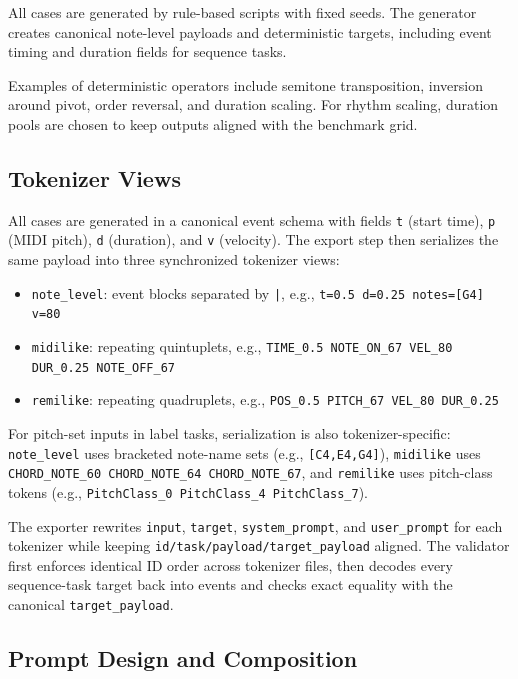 \documentclass{article}
\begin{document}
All cases are generated by rule-based scripts with fixed seeds. The generator creates canonical note-level payloads and deterministic targets, including event timing and duration fields for sequence tasks.

Examples of deterministic operators include semitone transposition, inversion around pivot, order reversal, and duration scaling. For rhythm scaling, duration pools are chosen to keep outputs aligned with the benchmark grid.

\subsection{Tokenizer Views}

All cases are generated in a canonical event schema with fields \texttt{t} (start time), \texttt{p} (MIDI pitch), \texttt{d} (duration), and \texttt{v} (velocity). The export step then serializes the same payload into three synchronized tokenizer views:
\begin{itemize}
    \item \texttt{note\_level}: event blocks separated by \texttt{|}, e.g., \texttt{t=0.5 d=0.25 notes=[G4] v=80}
    \item \texttt{midilike}: repeating quintuplets, e.g., \texttt{TIME\_0.5 NOTE\_ON\_67 VEL\_80 DUR\_0.25 NOTE\_OFF\_67}
    \item \texttt{remilike}: repeating quadruplets, e.g., \texttt{POS\_0.5 PITCH\_67 VEL\_80 DUR\_0.25}
\end{itemize}

For pitch-set inputs in label tasks, serialization is also tokenizer-specific: \texttt{note\_level} uses bracketed note-name sets (e.g., \texttt{[C4,E4,G4]}), \texttt{midilike} uses \texttt{CHORD\_NOTE\_60 CHORD\_NOTE\_64 CHORD\_NOTE\_67}, and \texttt{remilike} uses pitch-class tokens (e.g., \texttt{PitchClass\_0 PitchClass\_4 PitchClass\_7}).

The exporter rewrites \texttt{input}, \texttt{target}, \texttt{system\_prompt}, and \texttt{user\_prompt} for each tokenizer while keeping \texttt{id/task/payload/target\_payload} aligned. The validator first enforces identical ID order across tokenizer files, then decodes every sequence-task target back into events and checks exact equality with the canonical \texttt{target\_payload}.

\subsection{Prompt Design and Composition}
\end{document}
